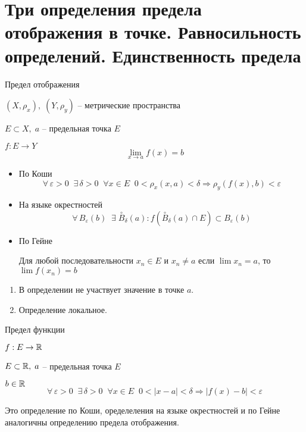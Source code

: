 \section{Три определения предела отображения в точке. Равносильность определений. Единственность предела}
\begin{conj} 
    Предел отображения 
\end{conj}
$(X, \rho_x), \; (Y, \rho_y)$ -- метрические пространства 

$E \subset X, \; a$ -- предельная точка $E$

$f : E \to Y$
\[ \lim_{x \to a} f(x) = b \]
\begin{itemize}
    \item По Коши
    \[ \forall \, \varepsilon > 0 \;\; \exists \, \delta > 0 \;\; \forall x \in E \;\; 0 < \rho_x(x, a) < \delta \Rightarrow \rho_y(f(x), b) < \varepsilon \]
    \item На языке окрестностей
    \[ \forall \, B_{\varepsilon}(b) \;\; \exists \; \overset{\circ}{B}_{\delta}(a) : f(\overset{\circ}{B}_{\delta}(a) \cap E) \subset B_{\varepsilon}(b) \]
    \item По Гейне
    
    Для любой последовательности $x_n \in E$ и $x_n \neq a$ если $\lim x_n = a$, то $\lim f(x_n) = b$
\end{itemize}

\begin{notice}
    \begin{enumerate}
        \item В определении не участвует значение в точке $a$.
        \item Определение локальное.
    \end{enumerate}
\end{notice}

\begin{conj} 
    Предел функции 
\end{conj}
$f : E \to \mathbb{R}$

$E \subset \mathbb{R}, \; a$ -- предельная точка $E$

$b \in \mathbb{R}$
\[ \forall \, \varepsilon > 0 \;\; \exists \, \delta > 0 \;\; \forall x \in E \;\; 0 < |x - a| < \delta \Rightarrow |f(x) - b| < \varepsilon \]
\begin{notice}
    Это определение по Коши, оределеления на языке окрестностей и по Гейне аналогичны определению предела отображения.
\end{notice}

